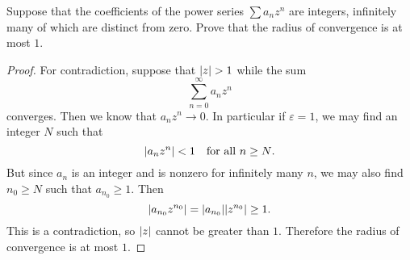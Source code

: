  Suppose that the coefficients of the power series
$\sum a_nz^n$ are integers, infinitely many of which are distinct from
zero. Prove that the radius of convergence is at most $1$.
\begin{proof}
  For contradiction, suppose that $\lvert{z}\rvert > 1$ while the sum
  \begin{equation*}
    \sum_{n=0}^\infty a_nz^n
  \end{equation*}
  converges. Then we know that $a_nz^n\to0$. In particular if
  $\varepsilon = 1$, we may find an integer $N$ such that
  \begin{equation*}
    \lvert{a_nz^n}\rvert < 1
    \quad\text{for all $n\geq N$}.
  \end{equation*}
  But since $a_n$ is an integer and is nonzero for infinitely many
  $n$, we may also find $n_0\geq N$ such that $a_{n_0}\geq1$. Then
  \begin{equation*}
    \lvert{a_{n_0}z^{n_0}}\rvert = \lvert{a_{n_0}}\rvert\lvert{z^{n_0}}\rvert \geq 1.
  \end{equation*}
  This is a contradiction, so $\lvert{z}\rvert$ cannot be greater than
  $1$. Therefore the radius of convergence is at most $1$.
\end{proof}

